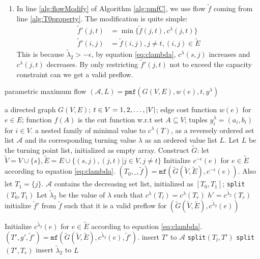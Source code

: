 \documentclass{article}
\begin{document}
\begin{enumerate}
\begin{proof}
By deduction, we conclude equation \eqref{eq:solutionProperty} holds and line \eqref{findLambda} always has solution.
\end{proof}
\item In line \ref{alg:flowModify} of Algorithm \ref{alg:pmfC}, we use flow $\tilde{f}$ coming from line \ref{alg:T0property}. The modification is quite simple:
\begin{align}
\tilde{f}'(j,t) &= \min\{\tilde{f}(j,t), c^{\lambda}(j,t) \} \\
\tilde{f}'(i,j) &= \tilde{f}(i,j), j \neq t, (i,j) \in \widetilde{E}
\end{align}
This is because $\tilde{\lambda}_2 > -\epsilon$, by equation \eqref{eq:clambda}, $c^{\lambda}(s,j)$ increases and $c^{\lambda} (j,t)$ decreases. By only restricting $\tilde{f}'(j,t)$ not to exceed the capacity constraint can we get a valid preflow.
\end{enumerate}

\begin{algorithm}
	\caption{parametric maximum flow $(\mathcal{A}, L) = \texttt{pmf}(G(V,E), w(e), t, y^{\lambda})$}\label{alg:pmfC}
	\begin{algorithmic}[1]
		\REQUIRE a directed graph $G(V, E)$; $t \in V={1,2,\dots, \lvert V\rvert}$; edge cost function $w(e)$ for $e \in E$; function $f(A)$ is the cut function w.r.t set $A\subseteq V$; tuples $y^{\lambda}_i = (a_i, b_i)$ for $i \in V$.
		\ENSURE a nested family of minimal value to $c^{\lambda}(T)$, as a reversely ordered set list $\mathcal{A}$ and its corresponding turning value $\lambda$ as an ordered value list $L$.
		\STATE Let $L$ be the turning point list, initialized as empty array.
		\STATE Construct $\widetilde{G}$: let $\widetilde{V}=V\cup\{s\}, \widetilde{E} = E\cup \{(s,j),(j,t)|j \in V, j\neq t\}$
		\STATE Initialize $c^{-\epsilon}(e)$ for $e \in \widetilde{E}$ according to equation \eqref{eq:clambda}.
		\STATE $ (T_0, \_, \tilde{f})  = \mathtt{mf}(\widetilde{G}(\widetilde{V}, \widetilde{E}), c^{-\epsilon}(e))$. Also let $T_1 = \{j\}$. \label{alg:T0property}
		\STATE $\mathcal{A}$ contains the decreasing set list, initialized as $[T_0, T_1]$;
		\STATE \texttt{split}$( T_0, T_1)$
		\STATE Let $\tilde{\lambda}_2$ be the value of $\lambda$ such that $c^{\lambda}(  T_l) = 
		c^{\lambda}(T_r)$ \label{findLambda}
		\STATE $h' = c^{\tilde{\lambda}_2}(T_r) $
		\STATE initialize $\tilde{f}'$ from $\tilde{f}$ such that it is a valid preflow for $(\widetilde{G}(\widetilde{V}, \widetilde{E}), c^{\tilde{\lambda}_2}(e))$ \label{alg:flowModify}

		\STATE Initialize $c^{\tilde{\lambda}_2}(e)$ for $e \in \widetilde{E}$ according to equation \eqref{eq:clambda}.
		\STATE $(T', g', \tilde{f}') = \mathtt{mf}(\widetilde{G}(\widetilde{V}, \widetilde{E}), c^{\tilde{\lambda}_2}(e), \tilde{f}')$.
		 \label{alg:lineLarge}
		\STATE insert $T'$ to $\mathcal{A}$
		\STATE \texttt{split}$(T_l, T')$
		\STATE \texttt{split}$(T', T_r)$
		\ELSE
		\STATE insert $\tilde{\lambda}_2$ to $L$
		\ENDIF
		\ENDFUNCTION
	\end{algorithmic}
\end{algorithm}
\end{document}
